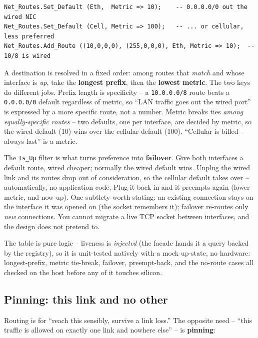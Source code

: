 \begin{lstlisting}
Net_Routes.Set_Default (Eth,  Metric => 10);    -- 0.0.0.0/0 out the wired NIC
Net_Routes.Set_Default (Cell, Metric => 100);   -- ... or cellular, less preferred
Net_Routes.Add_Route ((10,0,0,0), (255,0,0,0), Eth, Metric => 10);  -- 10/8 is wired
\end{lstlisting}

A destination is resolved in a fixed order: among routes that \emph{match} and whose
interface is \emph{up}, take the \textbf{longest prefix}, then the \textbf{lowest
metric}. The two keys do different jobs. Prefix length is specificity -- a
\texttt{10.0.0.0/8} route beats a \texttt{0.0.0.0/0} default regardless of metric, so
``LAN traffic goes out the wired port'' is expressed by a more specific route, not a
number. Metric breaks ties \emph{among equally-specific routes} -- two defaults, one
per interface, are decided by metric, so the wired default (10) wins over the
cellular default (100). ``Cellular is billed -- always last'' is a metric.

The \texttt{Is\_Up} filter is what turns preference into \textbf{failover}. Give both
interfaces a default route, wired cheaper; normally the wired default wins. Unplug the
wired link and its routes drop out of consideration, so the cellular default takes
over -- automatically, no application code. Plug it back in and it preempts again
(lower metric, and now up). One subtlety worth stating: an existing connection stays
on the interface it was opened on (the socket remembers it); failover re-routes only
\emph{new} connections. You cannot migrate a live TCP socket between interfaces, and
the design does not pretend to.

The table is pure logic -- liveness is \emph{injected} (the facade hands it a query
backed by the registry), so it is unit-tested natively with a mock up-state, no
hardware: longest-prefix, metric tie-break, failover, preempt-back, and the no-route
cases all checked on the host before any of it touches silicon.

\subsection{Pinning: this link and no other}

Routing is for ``reach this sensibly, survive a link loss.'' The opposite need --
``this traffic is allowed on exactly one link and nowhere else'' -- is
\textbf{pinning}:

